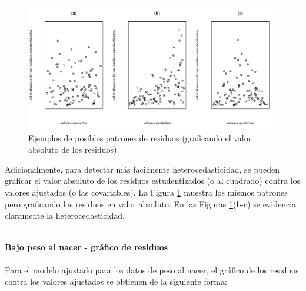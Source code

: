 \documentclass[
]{article}
\begin{document}
\begin{figure}

{\centering \includegraphics{MLGI_files/figure-latex/patronesResiduos2-1} 

}

\caption{Ejemplos de posibles patrones de residuos (graficando el valor absoluto de los residuos).}\label{fig:patronesResiduos2}
\end{figure}

Adicionalmente, para detectar más facilmente heterocedasticidad, se pueden graficar el valor absoluto de los residuos estudentizados (o al cuadrado) contra los valores ajustados (o las covariables). La Figura \ref{fig:patronesResiduos2} muestra los mismos patrones pero graficando los residuos en valor absoluto. En las Figuras \ref{fig:patronesResiduos2}(b-c) se evidencia claramente la heterocedasticidad.

\rule{\textwidth}{0.4pt}

\hypertarget{bajo-peso-al-nacer---gruxe1fico-de-residuos}{%
\paragraph*{Bajo peso al nacer - gráfico de residuos}\label{bajo-peso-al-nacer---gruxe1fico-de-residuos}}

Para el modelo ajustado para los datos de peso al nacer, el gráfico de los residuos contra los valores ajustados se obtienen de la siguiente forma:
\end{document}

